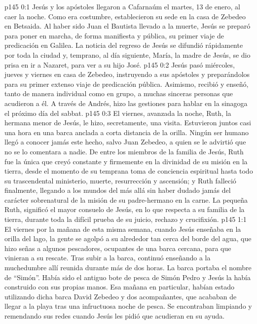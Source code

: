 \author{Comisión de seres intermedios}
\vs p145 0:1 Jesús y los apóstoles llegaron a Cafarnaúm el martes, 13 de enero, al caer la noche. Como era costumbre, establecieron su sede en la casa de Zebedeo en Betsaida. Al haber sido Juan el Bautista llevado a la muerte, Jesús se preparó para poner en marcha, de forma manifiesta y pública, su primer viaje de predicación en Galilea. La noticia del regreso de Jesús se difundió rápidamente por toda la ciudad y, temprano, al día siguiente, María, la madre de Jesús, se dio prisa en ir a Nazaret, para ver a su hijo José.
\vs p145 0:2 Jesús pasó miércoles, jueves y viernes en casa de Zebedeo, instruyendo a sus apóstoles y preparándolos para su primer extenso viaje de predicación pública. Asimismo, recibió y enseñó, tanto de manera individual como en grupo, a muchas sinceras personas que acudieron a él. A través de Andrés, hizo las gestiones para hablar en la sinagoga el próximo día del sabbat.
\vs p145 0:3 El viernes, avanzada la noche, Ruth, la hermana menor de Jesús, le hizo, secretamente, una visita. Estuvieron juntos casi una hora en una barca anclada a corta distancia de la orilla. Ningún ser humano llegó a conocer jamás este hecho, salvo Juan Zebedeo, a quien se le advirtió que no se lo comentara a nadie. De entre los miembros de la familia de Jesús, Ruth fue la única que creyó constante y firmemente en la divinidad de su misión en la tierra, desde el momento de su temprana toma de conciencia espiritual hasta todo su trascendental ministerio, muerte, resurrección y ascensión; y Ruth falleció finalmente, llegando a los mundos del más allá sin haber dudado jamás del carácter sobrenatural de la misión de su padre\hyp{}hermano en la carne. La pequeña Ruth, significó el mayor consuelo de Jesús, en lo que respecta a su familia de la tierra, durante toda la difícil prueba de su juicio, rechazo y crucifixión.
\vs p145 1:1 El viernes por la mañana de esta misma semana, cuando Jesús enseñaba en la orilla del lago, la gente se agolpó a su alrededor tan cerca del borde del agua, que hizo señas a algunos pescadores, ocupantes de una barca cercana, para que vinieran a su rescate. Tras subir a la barca, continuó enseñando a la muchedumbre allí reunida durante más de dos horas. La barca portaba el nombre de “Simón”. Había sido el antiguo bote de pesca de Simón Pedro y Jesús la había construido con sus propias manos. Esa mañana en particular, habían estado utilizando dicha barca David Zebedeo y dos acompañantes, que acababan de llegar a la playa tras una infructuosa noche de pesca. Se encontraban limpiando y remendando sus redes cuando Jesús les pidió que acudieran en su ayuda.
